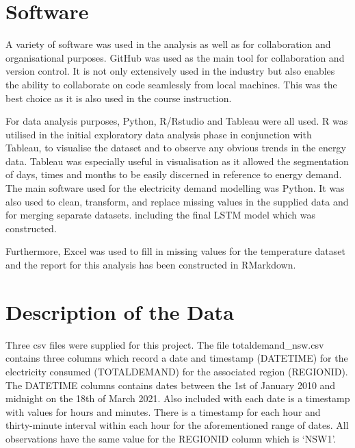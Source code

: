 \documentclass[mstat,12pt]{unswthesis}
\begin{document}
\hypertarget{software}{%
\section{Software}\label{software}}

A variety of software was used in the analysis as well as for
collaboration and organisational purposes. GitHub was used as the main
tool for collaboration and version control. It is not only extensively
used in the industry but also enables the ability to collaborate on code
seamlessly from local machines. This was the best choice as it is also
used in the course instruction.

\bigskip

For data analysis purposes, Python, R/Rstudio and Tableau were all used.
R was utilised in the initial exploratory data analysis phase in
conjunction with Tableau, to visualise the dataset and to observe any
obvious trends in the energy data. Tableau was especially useful in
visualisation as it allowed the segmentation of days, times and months
to be easily discerned in reference to energy demand. The main software
used for the electricity demand modelling was Python. It was also used
to clean, transform, and replace missing values in the supplied data and
for merging separate datasets. including the final LSTM model which was
constructed.

\bigskip

Furthermore, Excel was used to fill in missing values for the
temperature dataset and the report for this analysis has been
constructed in RMarkdown.

\hypertarget{description-of-the-data}{%
\section{Description of the Data}\label{description-of-the-data}}

Three csv files were supplied for this project. The file
totaldemand\_nsw.csv contains three columns which record a date and
timestamp (DATETIME) for the electricity consumed (TOTALDEMAND) for the
associated region (REGIONID). The DATETIME columns contains dates
between the 1st of January 2010 and midnight on the 18th of March 2021.
Also included with each date is a timestamp with values for hours and
minutes. There is a timestamp for each hour and thirty-minute interval
within each hour for the aforementioned range of dates. All observations
have the same value for the REGIONID column which is `NSW1'.
\end{document}
